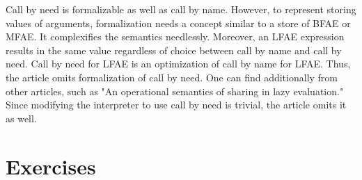 Call by need is formalizable as well as call by name. However, to represent
storing values of arguments, formalization needs a concept similar to a store of
BFAE or MFAE. It complexifies the semantics needlessly. Moreover, an LFAE
expression results in the same value regardless of choice between call by name
and call by need. Call by need for LFAE is an optimization of call by name for
LFAE. Thus, the article omits formalization of call by need. One can find
additionally from other articles, such as "An operational semantics of sharing in
lazy evaluation." Since modifying the interpreter to use call by need is
trivial, the article omits it as well.

\section{Exercises}

